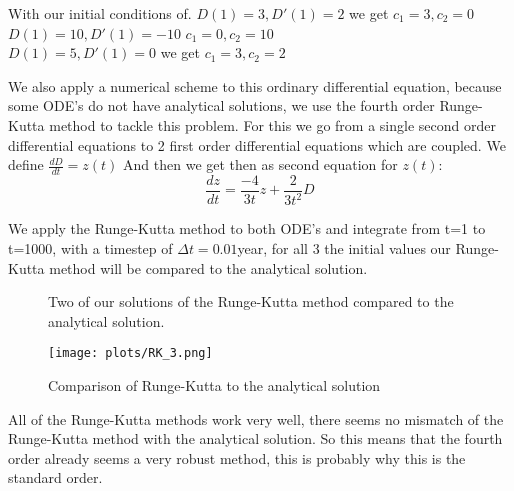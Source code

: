 With our initial conditions of.
$D(1)=3,D'(1)=2$ we get $c_1=3,c_2=0$\\
$D(1)=10,D'(1)=-10$ $c_1=0,c_2=10$\\
$D(1)=5,D'(1)=0$ we get $c_1=3,c_2=2$

We also apply a numerical scheme to this ordinary differential equation, because some ODE's do not have analytical solutions, we use the fourth order Runge-Kutta method to tackle this problem. For this we go from a single second order differential equations to 2 first order differential equations which are coupled. We define $\frac{dD}{dt}=z(t)$
And then we get then as second equation for $z(t)$:
\begin{equation}
\frac{dz}{dt}=\frac{-4}{3t}z+\frac{2}{3t^2}D
\end{equation}

We apply the Runge-Kutta method to both ODE's and integrate from t=1 to t=1000, with a timestep of $\Delta t=0.01$year, for all 3 the initial values our Runge-Kutta method will be compared to the analytical solution.

%


%


\begin{figure}
    \centering
    \qquad
    \caption{Two of our solutions of the Runge-Kutta method compared to the analytical solution.}
    \label{fig:rk}
\end{figure}

\begin{figure}[h]
   \centering
   \texttt{[image: plots/RK\_3.png]}
      \caption{Comparison of Runge-Kutta to the analytical solution}
\end{figure}


All of the Runge-Kutta methods work very well, there seems no mismatch of the Runge-Kutta method with the analytical solution. So this means that the fourth order already seems a very robust method, this is probably why this is the standard order.

